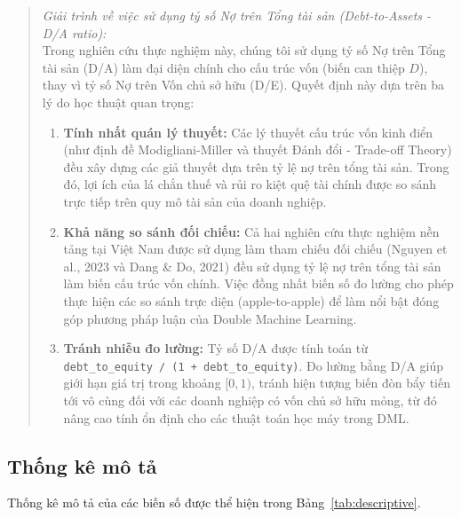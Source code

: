 \documentclass[12pt,a4paper]{article}
\begin{document}
\begin{quote}
\textit{Giải trình về việc sử dụng tỷ số Nợ trên Tổng tài sản (Debt-to-Assets - D/A ratio):} \\
Trong nghiên cứu thực nghiệm này, chúng tôi sử dụng tỷ số Nợ trên Tổng tài sản (D/A) làm đại diện chính cho cấu trúc vốn (biến can thiệp $D$), thay vì tỷ số Nợ trên Vốn chủ sở hữu (D/E). Quyết định này dựa trên ba lý do học thuật quan trọng:
\begin{enumerate}
    \item \textbf{Tính nhất quán lý thuyết:} Các lý thuyết cấu trúc vốn kinh điển (như định đề Modigliani-Miller và thuyết Đánh đổi - Trade-off Theory) đều xây dựng các giả thuyết dựa trên tỷ lệ nợ trên tổng tài sản. Trong đó, lợi ích của lá chắn thuế và rủi ro kiệt quệ tài chính được so sánh trực tiếp trên quy mô tài sản của doanh nghiệp.
    \item \textbf{Khả năng so sánh đối chiếu:} Cả hai nghiên cứu thực nghiệm nền tảng tại Việt Nam được sử dụng làm tham chiếu đối chiếu (Nguyen et al., 2023 và Dang \& Do, 2021) đều sử dụng tỷ lệ nợ trên tổng tài sản làm biến cấu trúc vốn chính. Việc đồng nhất biến số đo lường cho phép thực hiện các so sánh trực diện (apple-to-apple) để làm nổi bật đóng góp phương pháp luận của Double Machine Learning.
    \item \textbf{Tránh nhiễu đo lường:} Tỷ số D/A được tính toán từ \texttt{debt\_to\_equity / (1 + debt\_to\_equity)}. Đo lường bằng D/A giúp giới hạn giá trị trong khoảng $[0, 1)$, tránh hiện tượng biến đòn bẩy tiến tới vô cùng đối với các doanh nghiệp có vốn chủ sở hữu mỏng, từ đó nâng cao tính ổn định cho các thuật toán học máy trong DML.
\end{enumerate}
\end{quote}

\subsection{Thống kê mô tả}
Thống kê mô tả của các biến số được thể hiện trong Bảng~\ref{tab:descriptive}.
\end{document}
